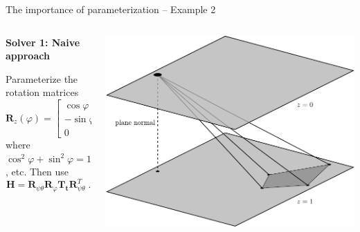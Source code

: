 \documentclass[aspectratio=169]{beamer}
\renewcommand{\phi}{\varphi}
\newcommand{\mat}[1]{\bm{#1}}
\newcommand{\T}{T}
\begin{document}
\begin{frame}[t]{The importance of parameterization -- Example 2}
\begin{columns}
    \begin{column}{0.5\textwidth}
        \begin{minipage}[t][\textheight][t]{\textwidth}
        \theimportanceTwoHeight
        \textbf{Solver 1: Naive approach}

        Parameterize the rotation matrices
        \begin{equation*}
            \mat{R}_z(\phi) = \begin{bmatrix}
                \cos{\phi} & \sin{\phi} & 0 \\
                -\sin{\phi} & \cos{\phi} & 0 \\
                0 &0 &1
            \end{bmatrix}
        \end{equation*}
        where~$\cos^2{\phi}+\sin^2{\phi} = 1$, etc. Then use
        \[
            \mat{H} = \mat{R}_{\psi\theta}\mat{R}_{\phi}\mat{T}_{\mat{t}}\mat{R}_{\psi\theta}^{\T}\;.
        \]
        \end{minipage}
    \end{column}%
    \begin{column}{0.5\textwidth}
        \centering
        \includegraphics[width=\linewidth]{../lecture_notes/images/prob_geom1.pdf}
    \end{column}
\end{columns}
\end{frame}
\end{document}
